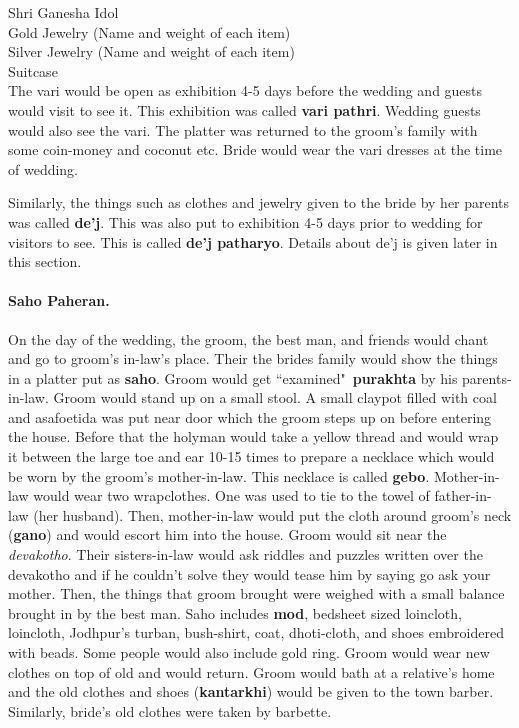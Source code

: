Shri Ganesha Idol\\
Gold Jewelry (Name and weight of each item)\\
Silver Jewelry (Name and weight of each item)\\
Suitcase\\

The vari would be open as exhibition 4-5 days before the wedding and guests
would visit to see it. This exhibition was called \textbf{vari pathri}. Wedding
guests would also see the vari. The platter was returned to the groom's family
with some coin-money and coconut etc. Bride would wear the vari dresses at the
time of wedding.

Similarly, the things such as clothes and jewelry given to the bride by her
parents was called \textbf{de'j}. This was also put to exhibition 4-5 days
prior to wedding for visitors to see. This is called \textbf{de'j patharyo}.
Details about de'j is given later in this section.

\paragraph{Saho Paheran.} On the day of the wedding, the groom, the best man,
and friends would chant and go to groom's in-law's place. Their the brides
family would show the things in a platter put as \textbf{saho}. Groom would
get ``examined"~\textbf{purakhta} by his parents-in-law. Groom would stand
up on a small stool. A small claypot filled with coal and asafoetida was
put near door which the groom steps up on before entering the house. Before
that the holyman would take a yellow thread and would wrap it between the
large toe and ear 10-15 times to prepare a necklace which would be worn by
the groom's mother-in-law. This necklace is called \textbf{gebo}.
Mother-in-law would wear two wrapclothes. One was used to tie to the towel
of father-in-law (her husband). Then, mother-in-law would put the cloth
around groom's neck (\textbf{gano}) and would escort him into the house. Groom
would sit near the \textit{devakotho}. Their sisters-in-law would ask riddles
and puzzles written over the devakotho and if he couldn't solve they would
tease him by saying go ask your mother. Then, the things that groom brought
were weighed with a small balance brought in by the best man. Saho includes
\textbf{mod}, bedsheet sized loincloth, loincloth, Jodhpur's turban,
bush-shirt, coat, dhoti-cloth, and shoes embroidered with beads. Some
people would also include gold ring. Groom would wear new clothes on top of old
and would return. Groom would bath at a relative's home and the old clothes and
shoes (\textbf{kantarkhi}) would be given to the town barber. Similarly,
bride's old clothes were taken by barbette.

